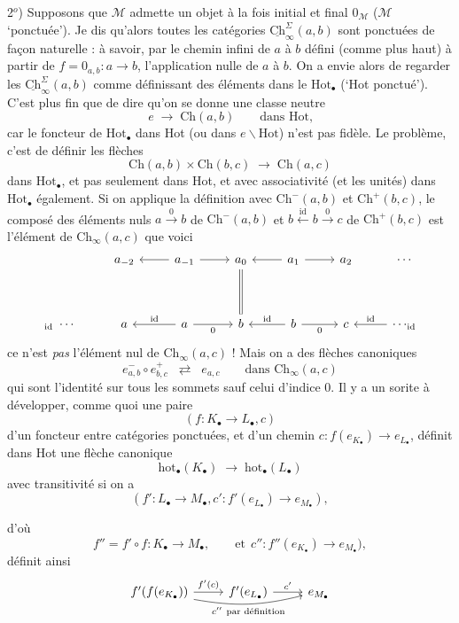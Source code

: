 \documentclass[11pt]{article}
\newcommand{\printedpage}[1]{\marginpar{\footnotesize p.~#1}}
\newcommand{\msp}[1]{\marginpar{\footnotesize [#1]}}
\newcommand{\M}{\mathcal{M}}
\newcommand{\Hot}{\mathrm{Hot}}
\newcommand{\Ch}{\mathrm{Ch}}
\newcommand{\uCh}{\underline{\mathrm{Ch}}}
\begin{document}
2$^o$) Supposons que $\M$ admette un objet à la fois initial et final $0_{\M}$ ($\M$ `ponctuée'). Je dis qu'alors toutes les catégories $\uCh^{\Sigma}_{\infty}(a,b)$ sont ponctuées de façon naturelle : à savoir, par le chemin infini de $a$ à $b$ défini (comme plus haut) à partir de $f = 0_{a,b} : a \longrightarrow b$, l'application nulle de $a$ à $b$. On a envie alors de regarder les $\uCh^{\Sigma}_{\infty}(a,b)$ comme définissant des éléments dans le $\Hot_{\bullet}$ (`Hot ponctué'). C'est plus fin que de dire qu'on se donne une classe neutre
\[
e \;\longrightarrow\; \Ch(a,b) \qquad \text{dans Hot,}
\]
car le foncteur de $\Hot_{\bullet}$ dans Hot (ou dans $e\backslash\Hot$) n'est pas fidèle. Le problème, c'est de définir les flèches
\[
\Ch(a,b)\times\Ch(b,c) \;\longrightarrow\; \Ch(a,c)
\]
dans $\Hot_{\bullet}$, et pas seulement dans Hot, et avec associativité (et les unités) dans $\Hot_{\bullet}$ également. Si on applique la définition avec $\Ch^{-}(a,b)$ et $\Ch^{+}(b,c)$, le composé des éléments nuls $a \xrightarrow{\ 0\ } b$ de $\Ch^{-}(a,b)$ et $b \xleftarrow{\ \mathrm{id}\ } b \xrightarrow{\ 0\ } c$ de $\Ch^{+}(b,c)$
\printedpage{10}
\msp{page 16}
est l'élément de $\Ch_{\infty}(a,c)$ que voici
\[
\begin{tikzcd}[row sep=huge]
 & a_{-2} & a_{-1} \arrow[l] \arrow[r] & a_{0} \arrow[d, equal] & a_{1} \arrow[l] \arrow[r] & a_{2} & \cdots \\
{}_{\mathrm{id}}\ \cdots & a & a \arrow[l, "\mathrm{id}"'] \arrow[r, "0"'] & b & b \arrow[l, "\mathrm{id}"'] \arrow[r, "0"'] & c & \cdots_{\mathrm{id}} \arrow[l, "\mathrm{id}"']
\end{tikzcd}
\]
ce n'est \textit{pas} l'élément nul de $\Ch_{\infty}(a,c)$ ! Mais on a des flèches canoniques
\[
e^{-}_{a,b}\circ e^{+}_{b,c} \;\;\rightleftarrows\;\; e_{a,c} \qquad \text{dans } \Ch_{\infty}(a,c)
\]
qui sont l'identité sur tous les sommets sauf celui d'indice 0. Il y a un sorite à développer, comme quoi une paire
\[
(f : K_{\bullet} \longrightarrow L_{\bullet}, c)
\]
d'un foncteur entre catégories ponctuées, et d'un chemin $c : f(e_{K_{\bullet}}) \longrightarrow e_{L_{\bullet}}$, définit dans Hot une flèche canonique
\[
\mathrm{hot}_{\bullet}(K_{\bullet}) \;\longrightarrow\; \mathrm{hot}_{\bullet}(L_{\bullet})
\]
avec transitivité si on a
\[
(f' : L_{\bullet} \longrightarrow M_{\bullet}, c' : f'(e_{L_{\bullet}}) \longrightarrow e_{M_{\bullet}}),
\]

\msp{page 17}

d'où
\[
f'' = f'\circ f : K_{\bullet} \longrightarrow M_{\bullet}, \qquad \text{et}\ \ c'' : f''(e_{K_{\bullet}}) \longrightarrow e_{M_{\bullet}}), %
\]
définit ainsi
\[
\begin{tikzcd}
f'(f(e_{K_{\bullet}})) \arrow[r, "f'(c)"] \arrow[rr, bend right=12, "{c''\ \text{par définition}}"'] & f'(e_{L_{\bullet}}) \arrow[r, "c'"] & e_{M_{\bullet}}
\end{tikzcd}
\]
\end{document}
